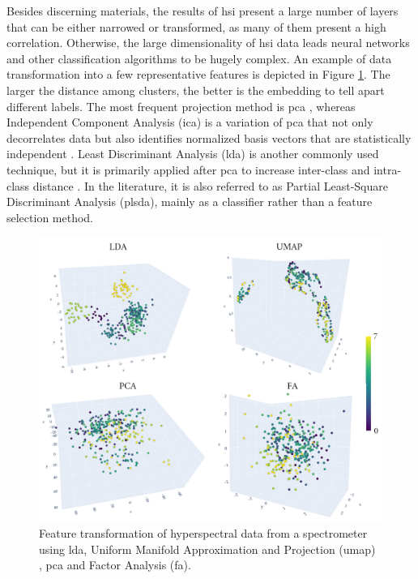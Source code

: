 Besides discerning materials, the results of \acrshort{hsi} present a large number of layers that can be either narrowed or transformed, as many of them present a high correlation. Otherwise, the large dimensionality of \acrshort{hsi} data leads neural networks and other classification algorithms to be hugely complex. An example of data transformation into a few representative features is depicted in Figure \ref{fig:feature_reduction_spectrometer}. The larger the distance among clusters, the better is the embedding to tell apart different labels. The most frequent projection method is \acrshort{pca} \cite{jiang_rapid_2022, shenming_new_2022, lu_hyperspectral_2022}, whereas Independent Component Analysis (\acrshort{ica}) is a variation of \acrshort{pca} that not only decorrelates data but also identifies normalized basis vectors that are statistically independent \cite{pu_hyperspectral_2017}. Least Discriminant Analysis (\acrshort{lda}) is another commonly used technique, but it is primarily applied after \acrshort{pca} to increase inter-class and intra-class distance \cite{shenming_new_2022}. In the literature, it is also referred to as Partial Least-Square Discriminant Analysis (\acrshort{plsda}), mainly as a classifier rather than a feature selection method.

\begin{figure}[ht]
    \centering
    \includegraphics[width=\linewidth]{figs/vineyard_classification/feature_reduction.png}
	\caption{Feature transformation of hyperspectral data from a spectrometer using \acrshort{lda}, Uniform Manifold Approximation and Projection (\acrshort{umap}) \cite{mcinnes_umap_2020}, \acrshort{pca} and Factor Analysis (\acrshort{fa}).  }
	\label{fig:feature_reduction_spectrometer}
\end{figure}

